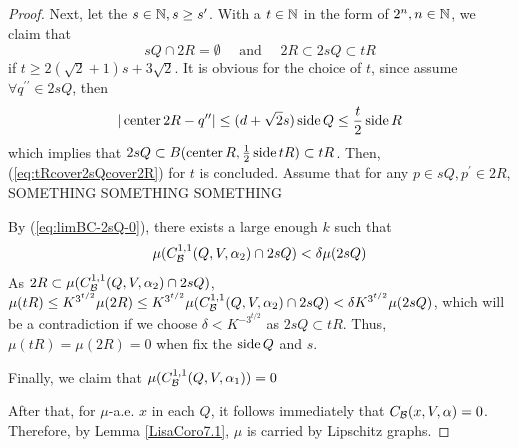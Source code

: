 \begin{proof}
    Next, let the $s\in\mathbb{N}, s\geq s^\prime$. With a $t\in\mathbb{N}$ in the form of $2^n, n\in\mathbb{N}$, we claim that 
    \begin{equation}\label{eq:tRcover2sQcover2R}
        sQ\cap 2R = \emptyset \quad\text{ and }\quad 2R\subset 2sQ\subset tR
    \end{equation}
    if $t\geq 2(\sqrt{2}+1)s + 3\sqrt{2}$. It is obvious for the choice of $t$, since assume $\forall q^{\prime\prime}\in 2sQ$, then
    \begin{equation*}
        |\operatorname{center} 2R - q^{\prime\prime}|\leq (d+\sqrt{2}s)\operatorname{side} Q \leq \frac{t}{2}\operatorname{side} R
    \end{equation*}
    which implies that $2sQ \subset B(\operatorname{center} R, \frac{1}{2}\operatorname{side} tR)\subset tR$. Then, (\ref{eq:tRcover2sQcover2R}) for $t$ is concluded. 
    Assume that for any $p\in sQ, p^\prime\in 2R$, SOMETHING SOMETHING SOMETHING 



    By (\ref{eq:limBC-2sQ-0}), there exists a large enough $k$ such that
    \begin{equation}
        \mu(C_\mathcal B^{1,1}(Q, V, \alpha_2)\cap 2sQ) < \delta\mu(2sQ)
    \end{equation}
    As $2R\subset \mu(C_\mathcal B^{1,1}(Q, V, \alpha_2)\cap 2sQ)$, $\mu(tR)\leq K^{3^{t/2}}\mu(2R)\leq K^{3^{t/2}}\mu(C_\mathcal B^{1,1}(Q, V, \alpha_2)\cap 2sQ) < \delta K^{3^{t/2}} \mu(2sQ)$, which will be a contradiction if we choose $\delta<K^{-3^{t/2}}$ as $2sQ\subset tR$. Thus, $\mu(tR) = \mu(2R) = 0$ when fix the $\operatorname{side} Q$ and $s$.





    Finally, we claim that $\mu(C_\mathcal B^{1,1}(Q, V,\alpha_1)) = 0$


    After that, for $\mu$-a.e. $x$ in each $Q$, it follows immediately that $C_\mathcal B(x, V, \alpha) = 0$. Therefore, by Lemma \ref{LisaCoro7.1}, $\mu$ is carried by Lipschitz graphs. 
\end{proof}








